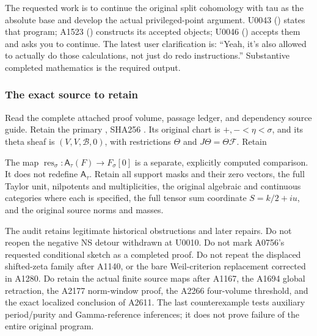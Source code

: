 The requested work is to continue the original split cohomology with tau
as the absolute base and develop the actual privileged-point argument.
U0043 (\protect{}) states that
program; A1523 (\protect{})
constructs its accepted objects; U0046
(\protect{}) accepts them and
asks you to continue. The latest user clarification is: ``Yeah, it's
also allowed to actually do those calculations, not just do redo
instructions.'' Substantive completed mathematics is the required
output.

\subsubsection{The exact source to
retain}\label{the-exact-source-to-retain}

Read the complete attached proof volume, passage ledger, and dependency
source guide. Retain the primary
\protect{}, SHA256
\protect{}.
Its original chart is \(+,-<\eta<\sigma\), and its theta sheaf is
\((V,V,\mathscr B,0)\), with restrictions \(\Theta\) and
\(J\Theta=\Theta\mathcal F\). Retain

 

The map \(\operatorname{res}_\sigma:\mathsf A_\tau(F)\to F_\sigma[0]\)
is a separate, explicitly computed comparison. It does not redefine
\(\mathsf A_\tau\). Retain all support masks and their zero vectors, the
full Taylor unit, nilpotents and multiplicities, the original algebraic
and continuous categories where each is specified, the full tensor sum
coordinate \(S=k/2+iu\), and the original source norms and masses.

The audit retains legitimate historical obstructions and later repairs.
Do not reopen the negative NS detour withdrawn at U0010. Do not mark
A0756's requested conditional sketch as a completed proof. Do not repeat
the displaced shifted-zeta family after A1140, or the bare
Weil-criterion replacement corrected in A1280. Do retain the actual
finite source maps after A1167, the A1694 global retraction, the A2177
norm-window proof, the A2266 four-volume threshold, and the exact
localized conclusion of A2611. The last counterexample tests auxiliary
period/purity and Gamma-reference inferences; it does not prove failure
of the entire original program.

